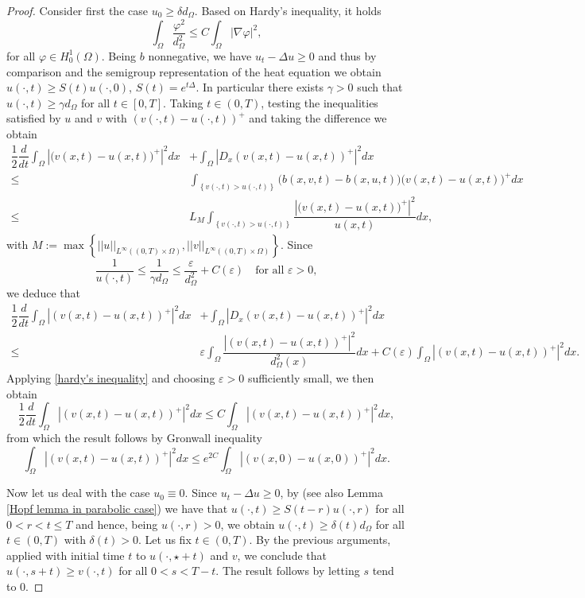 \documentclass[11pt, reqno]{amsart}
\theoremstyle{definition}
\numberwithin{equation}{section}
\def\abs#1{|#1|}
\begin{document}
\begin{proof}
Consider first the case $u_0\geq \delta d_\Omega$.
	Based on Hardy's inequality, it holds 
	\begin{equation}\label{hardy's inequality}
		\int_{\Omega}\dfrac{\varphi^2}{d^2_\Omega}\leq C\int_\Omega \abs{\nabla \varphi}^2,
	\end{equation}
	for all $\varphi\in H^1_0(\Omega)$. Being $b$ nonnegative, we have $u_t-\Delta u\geq 0$ and thus by comparison and the semigroup representation of the heat equation we obtain $u(\cdot,t)\geq S(t)u(\cdot,0)$, $S(t)=e^{t \Delta}$. 
 In particular there exists $\gamma>0$ such that $u(\cdot,t)\geq \gamma d_\Omega$ for all $t\in[0,T]$. 
 Taking $t\in (0,T)$, testing the inequalities satisfied by $u$ and $v$ with $(v(\cdot,t)-u(\cdot,t))^+$ and taking the difference we obtain
	\begin{align*}
		\dfrac{1}{2}\dfrac{d}{dt}\int_{\Omega}\abs{\big(v(x,t)-u(x,t)\big)^{+}}^2dx& 
		+ \int_{\Omega}\abs{D_x (v(x,t)-u(x,t))^+}^2dx
		\\ \leq& \int_{\left\{v(\cdot,t)>u(\cdot,t)\right\}}\big(b(x,v, t)-b(x,u, t))(v(x,t)-u(x,t)\big)^+dx\\
		\leq& L_M \int_{\left\{v(\cdot,t)>u(\cdot,t)\right\}} \dfrac{\abs{\big(v(x,t)-u(x,t)\big)^{+}}^2}{u(x,t)}dx,
	\end{align*}
	with $M:=\max \left\{||u||_{L^\infty((0,T)\times\Omega)},||v||_{L^\infty((0,T)\times\Omega)}\right\}$. 
	Since 
	\[\dfrac{1}{u(\cdot,t)}\leq \dfrac{1}{\gamma d_\Omega}\leq \dfrac{\varepsilon}{d^2_\Omega}+C(\varepsilon) \quad \text{for all }\varepsilon>0,\]
	we deduce that 
\begin{align*}
	\dfrac{1}{2}\dfrac{d}{dt}\int_{\Omega}\abs{(v(x,t)-u(x,t))^{+}}^2dx&+\int_{\Omega}\abs{D_x(v(x,t)-u(x,t))^+}^2dx\\\leq& \varepsilon \int_{\Omega}\dfrac{\abs{(v(x,t)-u(x,t))^{+}}^2}{d^2_\Omega(x)}dx+C(\varepsilon)\int_\Omega \abs{(v(x,t)-u(x,t))^{+}}^2dx.
\end{align*}
	Applying \eqref{hardy's inequality} and choosing $\varepsilon>0$ sufficiently small, we then obtain 
	\[ \dfrac{1}{2}\dfrac{d}{dt}\int_\Omega \abs{(v(x,t)-u(x,t))^{+}}^2dx\leq C\int_\Omega\abs{(v(x,t)-u(x,t))^{+}}^2dx, \]
	from which the result follows by Gronwall inequality
	$$\int_\Omega \abs{(v(x,t)-u(x,t))^{+}}^2dx \leq e^{2C} \int_\Omega\abs{(v(x,0)-u(x,0))^{+}}^2dx.$$
	
	Now let us deal with the case $u_0\equiv 0$. 
	Since $u_t-\Delta u\geq 0$, by \cite[Remark 6.1]{CazenaveDicksteinEscobedo} (see also Lemma \ref{Hopf lemma in parabolic case}) we have that $u(\cdot,t)\geq S(t-r)u(\cdot,r)$ for all $0< r < t \leq T$ and hence, being $u(\cdot,r)>0$, we obtain 
	 $u(\cdot,t)\geq \delta(t)d_\Omega$ for all $t\in (0,T)$ with $\delta(t)>0$. 
	 Let us fix $t \in (0,T)$. By the previous arguments, applied with initial time $t$ to $u(\cdot, \star + t)$ and $v$, we conclude that $u(\cdot,s+t)\geq v(\cdot,t)$ for all $0<s<T-t$. 
	 The result follows by  letting $s$ tend to $0$. 
\end{proof}
\end{document}
